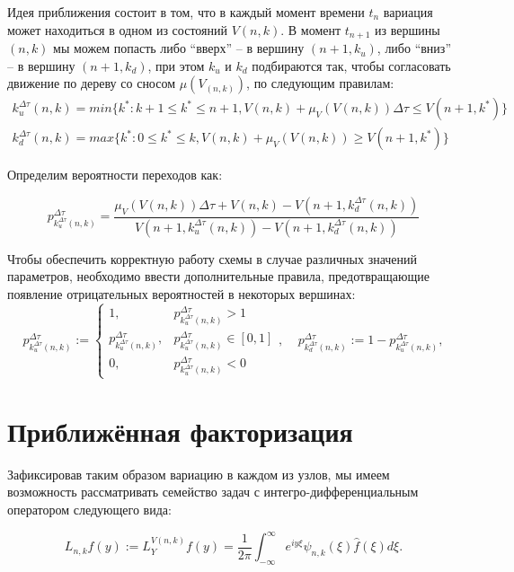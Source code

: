 \documentclass[draft, 12pt]{article}
\begin{document}
Идея приближения состоит в том, что в каждый момент времени $t_n$ вариация может находиться в одном из состояний $V(n,k)$. В момент $t_{n+1}$ из вершины $(n,k)$ мы можем попасть либо ``вверх'' -- в вершину $(n+1,k_u)$, либо ``вниз'' -- в вершину $(n+1,k_d)$, при этом $k_u$ и $k_d$ подбираются так, чтобы согласовать движение по дереву со сносом $\mu(V_{(n,k)})$, по следующим правилам:
\begin{eqnarray*}
	k_u^{\Delta \tau}(n,k) = min\{{k^\ast} : k + 1 \le k^\ast \le n + 1, V(n,k) + \mu_{V}(V(n,k)){\Delta \tau} \le V(n+1,k^\ast)\} \\
	k_d^{\Delta \tau}(n,k) = max\{{k^\ast} : 0 \le k^\ast \le k, V(n,k) + \mu_{V}(V(n,k)) \ge V(n+1,k^\ast)\}
\end{eqnarray*}

Определим вероятности переходов как:

$$
p^{\Delta \tau}_{k^{\Delta \tau}_{u}(n,k)} = 
\frac{\mu_{V}(V(n,k))\Delta \tau+V(n,k)-V(n+1,k^{\Delta \tau}_{d}(n,k))}{V(n+1,k^{\Delta \tau}_{u}(n,k))-V(n+1,k^{\Delta \tau}_{d}(n,k))}
$$

Чтобы обеспечить корректную работу схемы в случае различных значений параметров, необходимо ввести дополнительные правила, предотвращающие появление отрицательных вероятностей в некоторых вершинах:
\begin{equation*}
p^{\Delta \tau}_{k^{\Delta \tau}_{u}(n,k)} :=
\begin{cases}
1, & p^{\Delta \tau}_{k^{\Delta \tau}_{u}(n,k)} > 1\\
p^{\Delta \tau}_{k^{\Delta \tau}_{u}(n,k)}, & p^{\Delta \tau}_{k^{\Delta \tau}_{u}(n,k)} \in [0, 1]\\
0, & p^{\Delta \tau}_{k^{\Delta \tau}_{u}(n,k)} < 0
\end{cases}
, \;\;\;\; p^{\Delta \tau}_{k^{\Delta \tau}_{d}(n,k)} := 1 - p^{\Delta \tau}_{k^{\Delta \tau}_{u}(n,k)},
\end{equation*}

\section{Приближённая факторизация}

Зафиксировав таким образом вариацию в каждом из узлов, мы имеем возможность рассматривать семейство задач с интегро-дифференциальным оператором следующего вида:

$$L_{n,k}f(y) := L_{Y}^{V(n,k)}f(y) = \frac{1}{2\pi}\int^\infty_{-\infty}e^{iy\xi}\psi_{n,k}(\xi)\hat{f}(\xi)d\xi.$$
\end{document}
